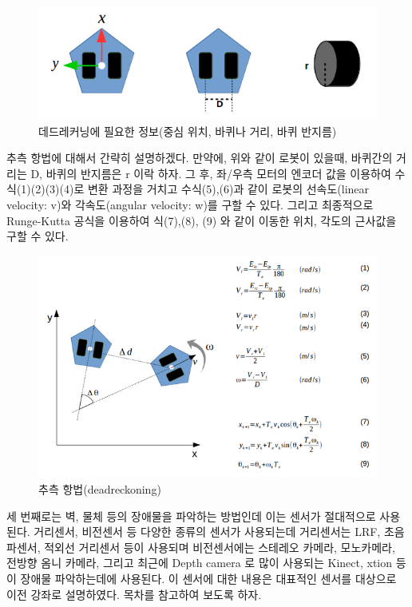 \begin{figure}[h]
\centering\includegraphics[width=0.9\columnwidth]{pictures/chapter11/deadreckoning.png}
\caption{데드레커닝에 필요한 정보(중심 위치, 바퀴나 거리, 바퀴 반지름)}
\end{figure}

추측 항법에 대해서 간략히 설명하겠다. 만약에, 위와 같이 로봇이 있을때, 바퀴간의 거리는 D, 바퀴의 반지름은 r 이락 하자. 그 후, 좌/우측 모터의 엔코더 값을 이용하여 수식(1)(2)(3)(4)로 변환 과정을 거치고 수식(5),(6)과 같이 로봇의 선속도(linear velocity: v)와 각속도(angular velocity: w)를 구할 수 있다. 그리고 최종적으로 Runge-Kutta 공식을 이용하여 식(7),(8), (9) 와 같이 이동한 위치, 각도의 근사값을 구할 수 있다.

\begin{figure}[h]
\centering\includegraphics[width=\columnwidth]{pictures/chapter11/deadreckoning2.png}
\caption{추측 항법(deadreckoning)}
\end{figure}

세 번째로는 벽, 물체 등의 장애물을 파악하는 방법인데 이는 센서가 절대적으로 사용된다. 거리센서, 비전센서 등 다양한 종류의 센서가 사용되는데 거리센서는 LRF, 초음파센서, 적외선 거리센서 등이 사용되며 비전센서에는 스테레오 카메라, 모노카메라, 전방향 옴니 카메라, 그리고 최근에 Depth camera 로 많이 사용되는 Kinect, xtion 등이 장애물 파악하는데에 사용된다. 이 센서에 대한 내용은 대표적인 센서를 대상으로 이전 강좌로 설명하였다. 목차를 참고하여 보도록 하자.

